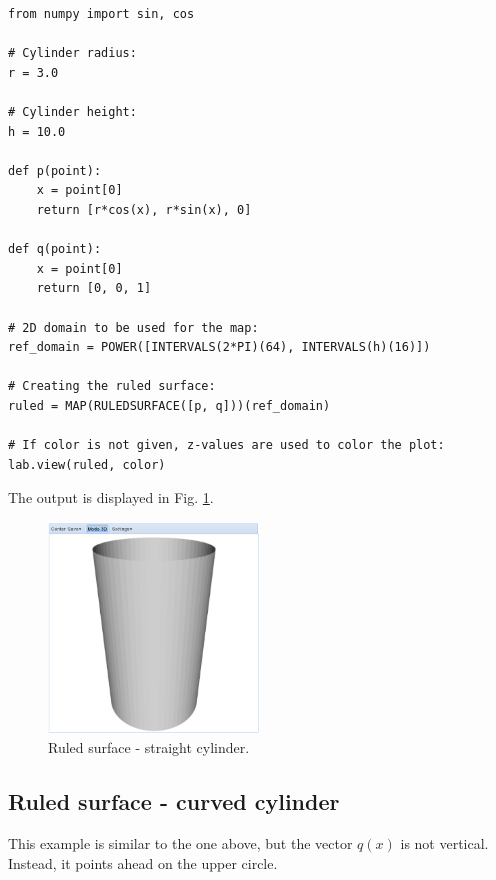 \documentclass[article,A4,12pt]{llncs}
\begin{document}
\begin{verbatim}
from numpy import sin, cos

# Cylinder radius:
r = 3.0

# Cylinder height:
h = 10.0

def p(point):
    x = point[0]
    return [r*cos(x), r*sin(x), 0]
  
def q(point):
    x = point[0]
    return [0, 0, 1]

# 2D domain to be used for the map:  
ref_domain = POWER([INTERVALS(2*PI)(64), INTERVALS(h)(16)])

# Creating the ruled surface:
ruled = MAP(RULEDSURFACE([p, q]))(ref_domain)

# If color is not given, z-values are used to color the plot:
lab.view(ruled, color)
\end{verbatim}
The output is displayed in Fig. \ref{fig:curves-8}.

\newpage

\begin{figure}[!ht]
\begin{center}
\includegraphics[width=0.5\textwidth]{img/curves-8.png}
\end{center}
\vspace{-2mm}
\caption{Ruled surface - straight cylinder.}
\label{fig:curves-8}
\end{figure}

\subsection{Ruled surface - curved cylinder}

This example is similar to the one above, but the vector 
$q(x)$ is not vertical. Instead, it points ahead on the
upper circle.
\end{document}

